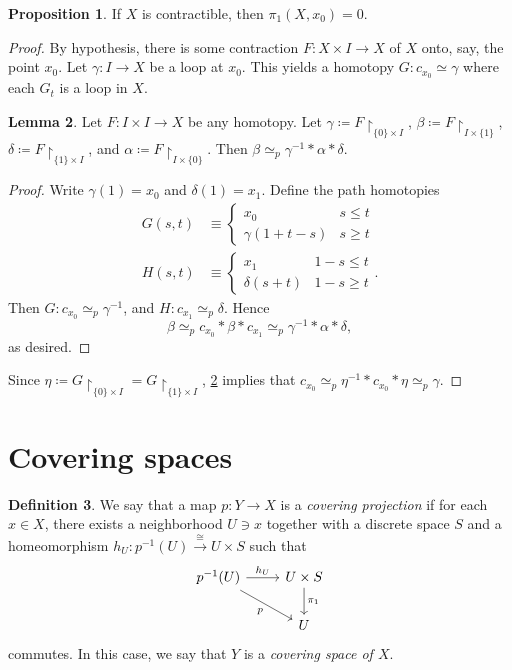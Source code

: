 \documentclass[10pt,letterpaper,cm]{nupset}
\theoremstyle{definition}
\newtheorem{definition}{Definition}[subsection]
\theoremstyle{theorem}
\newtheorem{lemma}[definition]{Lemma}
\newtheorem{prop}[definition]{Proposition}
\theoremstyle{remark}
\newcommand{\1}{\mathbb{1}}
\newcommand{\0}{\vec 0}
\begin{document}
\begin{prop}
If $X$ is contractible, then $\pi_1\left(X, x_0\right) = 0$.
\end{prop}
\begin{proof}
By hypothesis, there is some contraction $F: X \times I \to X$ of $X$ onto, say, the point $x_0$. Let $\gamma : I \to X$ be a loop at $x_0$. This yields a homotopy $G: c_{x_0} \simeq \gamma$ where each $G_t$ is a loop in $X$.
\begin{lemma}\label{chom}
Let $F: I \times I \to X$ be  any homotopy. Let $\gamma \coloneqq  F\restriction_{\{0\} \times I}$, $\beta \coloneqq  F\restriction_{I \times \{1\}}$, $\delta \coloneqq  F\restriction_{\{1\} \times I}$, and $\alpha \coloneqq F \restriction_{I \times \{0\}}$. Then $\beta \simeq_p \gamma^{-1} \ast \alpha \ast \delta$. 
\end{lemma}
\begin{proof} Write $\gamma(1) = x_0$ and $\delta(1) = x_1$. Define the path homotopies 
\begin{align*}
G(s,t) &\equiv \begin{cases} x_0 & s\leq t \\ \gamma(1 + t-s) & s \geq t   \end{cases}
\\ H(s,t) & \equiv \begin{cases}  x_1 & 1-s \leq t \\ \delta(s+t) & 1-s \geq t  \end{cases} .
\end{align*} Then $G: c_{x_0} \simeq_p \gamma^{-1}$, and $H: c_{x_1} \simeq_p \delta$. Hence $$\beta \simeq_p c_{x_0} \ast \beta \ast c_{x_1} \simeq_p \gamma^{-1} \ast \alpha \ast \delta, $$ as desired. 
\end{proof}
 Since $\eta \coloneqq  G\restriction_{\{0\} \times I} = G \restriction_{\{1\} \times I}$, \cref{chom} implies that $c_{x_0} \simeq_p \eta^{-1} \ast c_{x_0} \ast \eta \simeq_p \gamma$. 
\end{proof}


\section{Covering spaces} 

\begin{definition}
We say that a map $p: Y \to X$ is a \textit{covering projection} if for each $x\in X$, there exists a neighborhood $U\ni x$ together with a discrete space $S$ and a homeomorphism $h_U : p^{-1}(U) \overset{\cong}{\longrightarrow} U \times S$  such that 
\[
\begin{tikzcd}
p^{-1}(U) \arrow[rd, "p"'] \arrow[r, "h_U"] & U \times S \arrow[d, "\pi_1"] \\
 & U
\end{tikzcd}
\] commutes. In this case, we say that $Y$ is a \textit{covering space of $X$}.
\end{definition}
\end{document}
